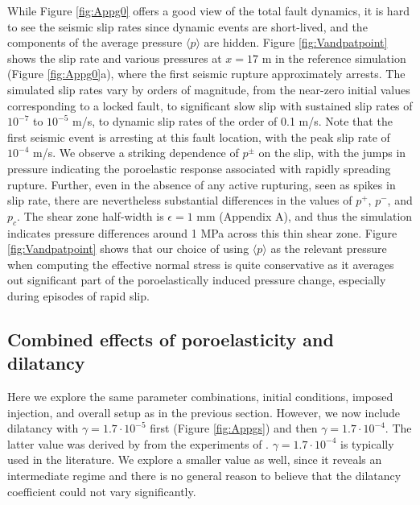 \documentclass[draft]{agujournal2019}
\begin{document}
While Figure \ref{fig:Appg0} offers a good view of the total fault dynamics, it is hard to see the seismic slip rates since dynamic events are short-lived, and the components of the average pressure $\langle p \rangle$ are hidden. Figure \ref{fig:Vandpatpoint} shows the slip rate and various pressures at $x = 17$ m in the reference simulation (Figure \ref{fig:Appg0}a), where the first seismic rupture approximately arrests. The simulated slip rates vary by orders of magnitude, from the near-zero initial values corresponding to a locked fault, to significant slow slip with sustained slip rates of $10^{-7}$ to $10^{-5}$ m/s, to dynamic slip rates of the order of 0.1 m/s. Note that the first seismic event is arresting at this fault location, with the peak slip rate of $10^{-4}$ m/s. We observe a striking dependence of $p^\pm$ on the slip, with the jumps in pressure indicating the poroelastic response associated with rapidly spreading rupture. Further, even in the absence of any active rupturing, seen as spikes in slip rate, there are nevertheless substantial differences in the values of $p^+$, $p^-$, and  $p_c$. The shear zone half-width is $\epsilon =  1$ mm (Appendix A), and thus the simulation indicates pressure differences around 1 MPa across this thin shear zone. Figure \ref{fig:Vandpatpoint} shows that our choice of using $\langle p \rangle$ as the relevant pressure when computing the effective normal stress is quite conservative as it averages out significant part of the poroelastically induced pressure change, especially during episodes of rapid slip. 

\subsection{Combined effects of poroelasticity and dilatancy}

Here we explore the same parameter combinations, initial conditions, imposed injection, and overall setup as in the previous section. However, we now include dilatancy with $\gamma = 1.7 \cdot 10^{-5}$ first (Figure \ref{fig:Appgs}) and then $\gamma = 1.7 \cdot 10^{-4}$. The latter value was derived by  from the experiments of . $\gamma = 1.7 \cdot 10^{-4}$ is typically used in the literature. We explore a smaller value as well, since it reveals an intermediate regime and there is no general reason to believe that the dilatancy coefficient could not vary significantly.
\end{document}
